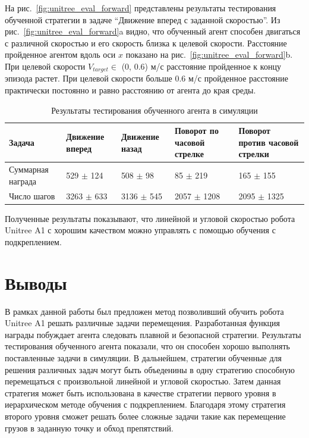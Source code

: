 На рис.~\ref{fig:unitree_eval_forward} представлены результаты тестирования обученной стратегии в задаче ``Движение вперед с заданной скоростью''. Из рис.~\ref{fig:unitree_eval_forward}a видно, что обученный агент способен двигаться с различной скоростью и его скорость близка к целевой скорости. Расстояние пройденное агентом вдоль оси $x$ показано на рис.~\ref{fig:unitree_eval_forward}b. При целевой скорости $V_{target} \in$ (0, 0.6) м/с расстояние пройденное к концу эпизода растет. При целевой скорости больше 0.6 м/с пройденное расстояние практически постоянно и равно расстоянию от агента до края среды.

\begin{table} [htbp]
    \centering
    \begin{threeparttable}
        \caption{Результаты тестирования обученного агента в симуляции}\label{tab:unitree_eval}
        \begin{tabular}{| p{3cm} || p{3cm} | p{3cm} | p{3cm} |p{3cm} |}
            \hline
            \hline
            Задача & Движение вперед & Движение назад & Поворот по часовой стрелке & Поворот против часовой стрелки \\
            \hline
            Суммарная награда &	529 $\pm$ 124 &	508 $\pm$ 98 &	85 $\pm$ 219 &	165 $\pm$ 155 \\
            Число шагов & 3263 $\pm$ 633 &	3136 $\pm$ 545 &	2057 $\pm$ 1208 &	2095 $\pm$ 1325 \\
            \hline
            \hline
        \end{tabular}
    \end{threeparttable}
\end{table}

Полученные результаты показывают, что линейной и угловой скоростью робота Unitree A1 с хорошим качеством можно управлять с помощью обучения с подкреплением. 

\section{Выводы}

В рамках данной работы был предложен метод позволивший обучить робота Unitree A1 решать различные задачи перемещения. Разработанная функция награды побуждает агента следовать плавной и безопасной стратегии. Результаты тестирования обученного агента показали, что он способен хорошо выполнять поставленные задачи в симуляции. В дальнейшем, стратегии обученные для решения различных задач могут быть объеденины в одну стратегию способную перемещаться с произвольной линейной и угловой скоростью. Затем данная стратегия может быть использована в качестве стратегии первого уровня в иерархическом методе обучения с подкреплением. Благодаря этому стратегия второго уровня сможет решать более сложные задачи такие как перемещение грузов в заданную точку и обход препятствий. 



\clearpage
